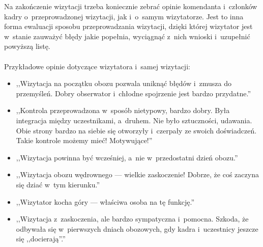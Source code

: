 \documentclass[a4paper,10pt,notitlepage,twoside]{article}
\begin{document}
Na zakończenie wizytacji trzeba koniecznie zebrać opinie komendanta i~członków kadry o~przeprowadzonej wizytacji, jak i~o~samym wizytatorze. Jest to inna forma ewaluacji sposobu przeprowadzania wizytacji, dzięki której wizytator jest w~stanie zauważyć błędy jakie popełnia, wyciągnąć z~nich wnioski i~uzupełnić powyższą listę.\\
\\
Przykładowe opinie dotyczące wizytatora i~samej wizytacji:
\begin{itemize}
\item ,,Wizytacja na początku obozu pozwala uniknąć błędów i~zmusza do przemyśleń. Dobry obserwator i~chłodne spojrzenie jest bardzo przydatne.''
\item ,,Kontrola przeprowadzona w~sposób nietypowy, bardzo dobry. Była integracja między uczestnikami, a~druhem. Nie było sztuczności, udawania. Obie strony bardzo na siebie się otworzyły i~czerpały ze swoich doświadczeń. Takie kontrole możemy mieć! Motywujące!''
\item ,,Wizytacja powinna być wcześniej, a~nie w~przedostatni dzień obozu.''
\item ,,Wizytacja obozu wędrownego --- wielkie zaskoczenie! Dobrze, że coś zaczyna się dziać w~tym kierunku.''
\item ,,Wizytator kocha góry --- właściwa osoba na tę funkcję.''
\item ,,Wizytacja z~zaskoczenia, ale bardzo sympatyczna i~pomocna. Szkoda, że odbywała się w~pierwszych dniach obozowych, gdy kadra i~uczestnicy jeszcze się ,,docierają''.''
\end{itemize}

\end{document}
